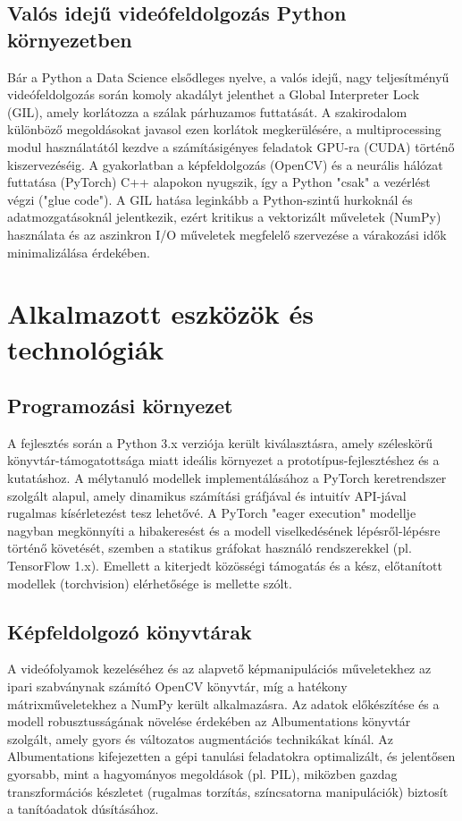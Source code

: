 \documentclass[12pt, a4paper]{report}
\begin{document}
\subsection{Valós idejű videófeldolgozás Python környezetben}
Bár a Python a Data Science elsődleges nyelve, a valós idejű, nagy teljesítményű videófeldolgozás során komoly akadályt jelenthet a Global Interpreter Lock (GIL), amely korlátozza a szálak párhuzamos futtatását. A szakirodalom különböző megoldásokat javasol ezen korlátok megkerülésére, a multiprocessing modul használatától kezdve a számításigényes feladatok GPU-ra (CUDA) történő kiszervezéséig. A gyakorlatban a képfeldolgozás (OpenCV) és a neurális hálózat futtatása (PyTorch) C++ alapokon nyugszik, így a Python "csak" a vezérlést végzi ("glue code"). A GIL hatása leginkább a Python-szintű hurkoknál és adatmozgatásoknál jelentkezik, ezért kritikus a vektorizált műveletek (NumPy) használata és az aszinkron I/O műveletek megfelelő szervezése a várakozási idők minimalizálása érdekében.

\section{Alkalmazott eszközök és technológiák}

\subsection{Programozási környezet}
A fejlesztés során a Python 3.x verziója került kiválasztásra, amely széleskörű könyvtár-támogatottsága miatt ideális környezet a prototípus-fejlesztéshez és a kutatáshoz. A mélytanuló modellek implementálásához a PyTorch keretrendszer szolgált alapul, amely dinamikus számítási gráfjával és intuitív API-jával rugalmas kísérletezést tesz lehetővé. A PyTorch "eager execution" modellje nagyban megkönnyíti a hibakeresést és a modell viselkedésének lépésről-lépésre történő követését, szemben a statikus gráfokat használó rendszerekkel (pl. TensorFlow 1.x). Emellett a kiterjedt közösségi támogatás és a kész, előtanított modellek (torchvision) elérhetősége is mellette szólt.

\subsection{Képfeldolgozó könyvtárak}
A videófolyamok kezeléséhez és az alapvető képmanipulációs műveletekhez az ipari szabványnak számító OpenCV könyvtár, míg a hatékony mátrixműveletekhez a NumPy került alkalmazásra. Az adatok előkészítése és a modell robusztusságának növelése érdekében az Albumentations könyvtár szolgált, amely gyors és változatos augmentációs technikákat kínál. Az Albumentations kifejezetten a gépi tanulási feladatokra optimalizált, és jelentősen gyorsabb, mint a hagyományos megoldások (pl. PIL), miközben gazdag transzformációs készletet (rugalmas torzítás, színcsatorna manipulációk) biztosít a tanítóadatok dúsításához.
\end{document}
